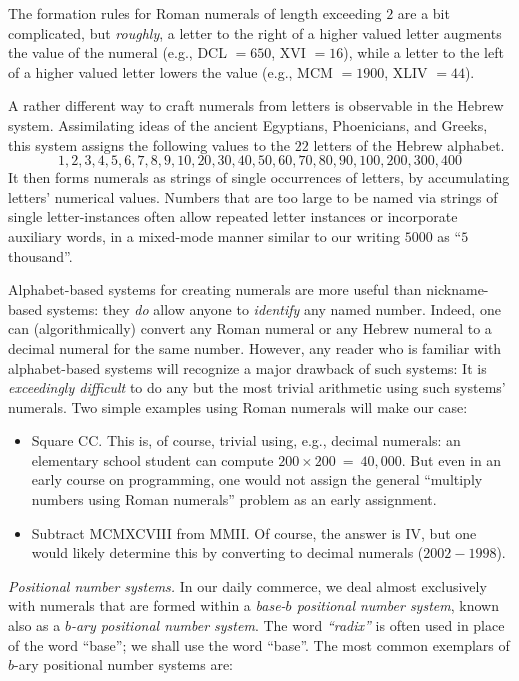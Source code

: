 \smallskip

\noindent
The formation rules for Roman numerals of length exceeding $2$ are a bit complicated, but {\em roughly}, a letter to the right of a higher valued letter augments the value of the numeral (e.g., DCL $=650$, XVI $=16$), while a letter to the left of a higher valued letter lowers the value (e.g., MCM $=1900$, XLIV $=44$).

\medskip

A rather different way to craft numerals from letters is observable in the Hebrew system.  Assimilating ideas of the ancient Egyptians, Phoenicians, and Greeks, this system assigns the
following values to the $22$ letters of the Hebrew alphabet.
\[ 1, 2, 3, 4, 5, 6, 7, 8, 9, 10,
20, 30, 40, 50, 60, 70, 80, 90, 100,
 200, 300, 400
\]
It then forms numerals as strings of single occurrences of letters, by accumulating letters' numerical values.  Numbers that are too large to be named via strings of single letter-instances often allow repeated letter instances or incorporate auxiliary words, in a mixed-mode manner similar to our writing $5000$ as ``$5$ thousand''.

\medskip

Alphabet-based systems for creating numerals are more useful than nickname-based systems: they {\em do} allow anyone to {\em identify} any named number. Indeed, one can (algorithmically) convert any Roman numeral or any Hebrew numeral to a decimal numeral for the same number.  However, any reader who is familiar with alphabet-based systems will recognize a major drawback of such systems: It is {\em exceedingly difficult} to do any but the most trivial arithmetic using such systems' numerals.  Two simple examples using Roman numerals will make our case:
\begin{itemize}
\item
Square CC.  This is, of course, trivial using, e.g., decimal numerals: an elementary school student can compute $200 \times 200 \ = \ 40,000$.  But even in an early course on programming, one would not assign the general ``multiply numbers using Roman numerals'' problem as an early assignment.

\item
Subtract MCMXCVIII from MMII.  Of course, the answer is IV, but one would likely determine this by converting to decimal numerals ($2002-1998$).
\end{itemize}

\medskip

 
\noindent
{\it Positional number systems.}
In our daily commerce, we deal almost exclusively with numerals that are formed within a {\it base-$b$ positional number system},  known also as a {\it $b$-ary positional number system}.
The word {\it ``radix''} is often used in place of the word ``base''; we shall use the word ``base''.  The most common exemplars of $b$-ary positional number systems are:


